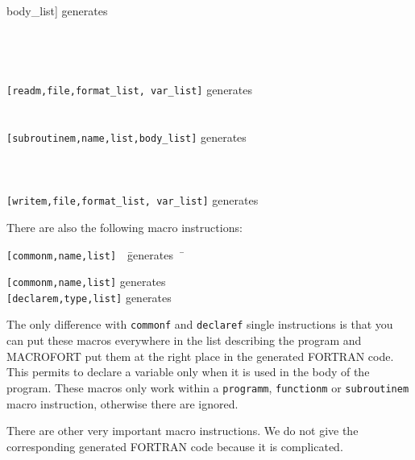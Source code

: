 \begin{tabbing}
{     {\rm body\_list}]} \>generates
     \\
    \> \\
    \> \\
    \> \\\\
  {\tt [readm,{\rm file},{\rm format\_list},
       {\rm var\_list}]} 
     \>generates
     \\
    \> \\\\
  {\tt [subroutinem,{\rm name},{\rm list},{\rm body\_list}]} 
     \>generates
     \\
    \> \\
    \> \\\\
  {\tt [writem,{\rm file},{\rm format\_list},
       {\rm var\_list}]} 
     \>generates
     \\
    \> 
\end{tabbing}

There are also the following macro instructions:
\begin{tabbing}
  {\tt [commonm,{\rm name},{\rm list}]}\ \ \=generates\ \ \= \kill 

  {\tt [commonm,{\rm name},{\rm list}]} 
     \>generates
     \\
  {\tt [declarem,{\rm type},{\rm list}]} 
     \>generates
\end{tabbing}
The only difference with {\tt commonf} and {\tt declaref} single
instructions is that you can put these macros everywhere in the list
describing the program and MACROFORT put them at the right place
in the generated FORTRAN code. This permits to declare a variable
only when it is used in the body of the program. These macros only
work within a {\tt programm}, {\tt functionm} or {\tt subroutinem}
macro instruction, otherwise there are ignored.

There are other very important macro instructions. We do not give the
corresponding generated FORTRAN code because it is complicated.


